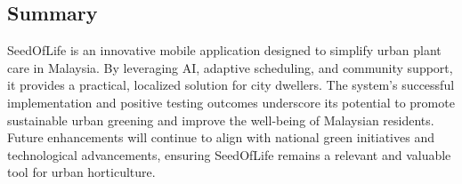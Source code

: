 \documentclass[conference]{IEEEtran}
\begin{document}
\subsection{Summary}
SeedOfLife is an innovative mobile application designed to simplify urban plant care in Malaysia. By leveraging AI, adaptive scheduling, and community support, it provides a practical, localized solution for city dwellers. The system’s successful implementation and positive testing outcomes underscore its potential to promote sustainable urban greening and improve the well-being of Malaysian residents. Future enhancements will continue to align with national green initiatives and technological advancements, ensuring SeedOfLife remains a relevant and valuable tool for urban horticulture.


 

\end{document}

